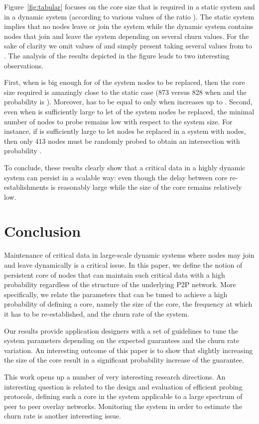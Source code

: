 \documentclass[]{llncs}
\begin{document}
Figure~\ref{fig:tabular} focuses on  the core size that is required in a static
system and in a dynamic system (according to various values of the ratio ).  
The static system implies that no nodes leave or join the system while
the dynamic system contains nodes that join and leave the system depending on
several churn values.
For the sake of clarity we omit values of  and 
simply present  taking several values from  to .
The analysis of the results depicted in the figure leads to two interesting 
observations.

First, when  is big enough for  of the system 
nodes to be replaced,  then the core size required is
amazingly close to the static case 
(873 versus 828 when  and the probability is ).
Moreover,  has to be equal to  only when  increases up to . 
Second, even when  is sufficiently large to let  
of the system nodes be replaced, the minimal number of nodes
to probe remains low with respect to the system size.  For instance, 
if  is sufficiently large to let  nodes be
replaced in a system with  nodes, then only 413 nodes  must be 
randomly probed to obtain an intersection with probability .


To conclude, these results clearly show that a critical data
in a highly dynamic system can persist in a scalable way: 
even though the delay between core re-establishments is reasonably 
large while the  size  of the  core remains  relatively low. 



\section{Conclusion}
\label{sec:discussion}

Maintenance of critical data in large-scale dynamic systems where nodes 
may join and leave dynamically is a critical issue. In this paper, 
we define the notion of persistent core of nodes that can
maintain such critical data  with a high probability regardless of 
the structure of the underlying P2P network.  
More specifically, we relate
the parameters that can be tuned to achieve a high probability of 
defining a core, namely the size of the core, the
frequency at which it has to be re-established, and the churn rate 
of the system.

Our results provide application designers with a set of guidelines 
to tune the system
parameters depending on the expected guarantees and the churn rate variation.
An interesting outcome of this paper is
to 
show that slightly increasing the size of the core result in a significant 
probability increase of the guarantee. 

This work opens up a number of very interesting research directions. 
An interesting question
is related to the design and evaluation of efficient probing protocols, defining such a core in the system
applicable to a large spectrum of peer to peer overlay networks.  
Monitoring the system 
in order to estimate the churn rate is another interesting issue.



\end{document}
